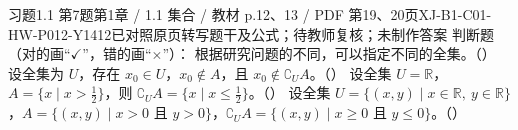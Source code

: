 \par\noindent\begin{minipage}{\linewidth}
\begin{bankitem}{习题1.1 第7题}{第1章 / 1.1 集合 / 教材 p.12、13 / PDF 第19、20页}{XJ-B1-C01-HW-P012-Y1412}{已对照原页转写题干及公式；待教师复核；未制作答案}
判断题（对的画“$\checkmark$”，错的画“$\times$”）：
根据研究问题的不同，可以指定不同的全集。\hfill（\quad）
设全集为 $U$，存在 $x_0\in U$，$x_0\notin A$，且 $x_0\notin\complement_U A$。\hfill（\quad）
设全集 $U=\mathbb R$，$A=\{x\mid x>\frac12\}$，则 $\complement_U A=\{x\mid x\le\frac12\}$。\hfill（\quad）
设全集 $U=\{(x,y)\mid x\in\mathbb R,\ y\in\mathbb R\}$，$A=\{(x,y)\mid x>0\text{ 且 }y>0\}$，$\complement_U A=\{(x,y)\mid x\ge0\text{ 且 }y\le0\}$。\hfill（\quad）
\end{bankitem}
\end{minipage}\par\medskip
